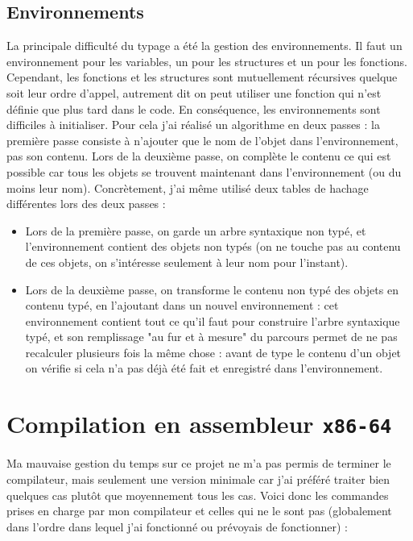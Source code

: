 \documentclass{scrartcl}
\begin{document}
\subsection{Environnements}

La principale difficulté du typage a été la gestion des environnements. Il faut un environnement pour les variables, un pour les structures et un pour les fonctions. Cependant, les fonctions et les structures sont mutuellement récursives quelque soit leur ordre d'appel, autrement dit on peut utiliser une fonction qui n'est définie que plus tard dans le code. En conséquence, les environnements sont difficiles à initialiser. Pour cela j'ai réalisé un algorithme en deux passes : la première passe consiste à n'ajouter que le nom de l'objet dans l'environnement, pas son contenu. Lors de la deuxième passe, on complète le contenu ce qui est possible car tous les objets se trouvent maintenant dans l'environnement (ou du moins leur nom). Concrètement, j'ai même utilisé deux tables de hachage différentes lors des deux passes :

\begin{itemize}
    \item Lors de la première passe, on garde un arbre syntaxique non typé, et l'environnement contient des objets non typés (on ne touche pas au contenu de ces objets, on s'intéresse seulement à leur nom pour l'instant).
    \item Lors de la deuxième passe, on transforme le contenu non typé des objets en contenu typé, en l'ajoutant dans un nouvel environnement : cet environnement contient tout ce qu'il faut pour construire l'arbre syntaxique typé, et son remplissage "au fur et à mesure" du parcours permet de ne pas recalculer plusieurs fois la même chose : avant de type le contenu d'un objet on vérifie si cela n'a pas déjà été fait et enregistré dans l'environnement.
\end{itemize}


\section{Compilation en assembleur \texttt{x86-64}}

Ma mauvaise gestion du temps sur ce projet ne m'a pas permis de terminer le compilateur, mais seulement une version minimale car j'ai préféré traiter bien quelques cas plutôt que moyennement tous les cas. Voici donc les commandes prises en charge par mon compilateur et celles qui ne le sont pas (globalement dans l'ordre dans lequel j'ai fonctionné ou prévoyais de fonctionner) :
\end{document}
